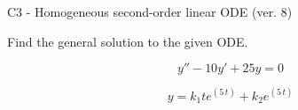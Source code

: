 \begin{exercise}
  \begin{exerciseTitle}C3 - Homogeneous second-order linear ODE (ver. 8)\end{exerciseTitle}
  \begin{exerciseStatement}
    
Find the general solution to the given ODE.

    
\[y''-10y'+25y = 0\]

  \end{exerciseStatement}
  \begin{exerciseAnswer}
    
\[y= k_{1} t e^{\left(5 \, t\right)} + k_{2} e^{\left(5 \, t\right)}\]

  \end{exerciseAnswer}
\end{exercise}
